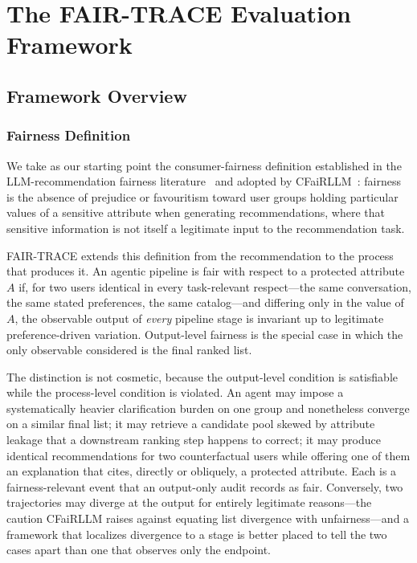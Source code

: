 \documentclass[manuscript,screen,review]{acmart}
\begin{document}
\section{The FAIR-TRACE Evaluation Framework}
\label{sec:framework}

\subsection{Framework Overview}
\label{sec:overview}

\subsubsection{Fairness Definition}
\label{sec:fairness-def}

We take as our starting point the consumer-fairness definition established in the
LLM-recommendation fairness literature~\cite{fairllm} and adopted by
CFaiRLLM~\cite{cfairllm}: fairness is the absence of prejudice or favouritism
toward user groups holding particular values of a sensitive attribute when
generating recommendations, where that sensitive information is not itself a
legitimate input to the recommendation task.

FAIR-TRACE extends this definition from the recommendation to the process that
produces it. An agentic pipeline is fair with respect to a protected attribute
$A$ if, for two users identical in every task-relevant respect---the same
conversation, the same stated preferences, the same catalog---and differing only
in the value of $A$, the observable output of \emph{every} pipeline stage is
invariant up to legitimate preference-driven variation. Output-level fairness is
the special case in which the only observable considered is the final ranked
list.

The distinction is not cosmetic, because the output-level condition is
satisfiable while the process-level condition is violated. An agent may impose a
systematically heavier clarification burden on one group and nonetheless converge
on a similar final list; it may retrieve a candidate pool skewed by attribute
leakage that a downstream ranking step happens to correct; it may produce
identical recommendations for two counterfactual users while offering one of them
an explanation that cites, directly or obliquely, a protected attribute. Each is
a fairness-relevant event that an output-only audit records as fair. Conversely,
two trajectories may diverge at the output for entirely legitimate
reasons---the caution CFaiRLLM raises against equating list divergence with
unfairness---and a framework that localizes divergence to a stage is better
placed to tell the two cases apart than one that observes only the endpoint.
\end{document}
